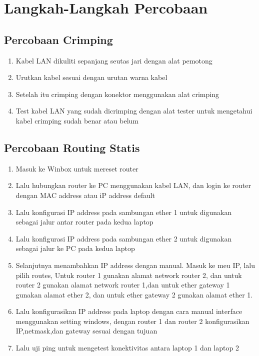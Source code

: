 \section{Langkah-Langkah Percobaan}

\subsection{Percobaan Crimping}
\begin{enumerate}
	\item Kabel LAN dikuliti sepanjang seutas jari dengan alat pemotong
	\item Urutkan kabel sesuai dengan urutan warna kabel
	\item Setelah itu crimping dengan konektor menggunakan alat crimping
	\item Test kabel LAN yang sudah dicrimping dengan  alat tester untuk mengetahui kabel crimping sudah benar atau belum
\end{enumerate}

\subsection{Percobaan Routing Statis}
\begin{enumerate}
    \item Masuk ke Winbox untuk mereset router
    \item Lalu hubungkan router ke PC menggunakan kabel LAN, dan login ke router dengan MAC address
    atau iP address default
    \item Lalu konfigurasi IP address pada sambungan ether 1 untuk digunakan sebagai jalur antar router pada kedua laptop
    \item Lalu konfigurasi IP address pada sambungan ether 2 untuk digunakan sebagai jalur ke PC pada kedua laptop
    \item Selanjutnya menambahkan IP address dengan manual. Masuk ke meu IP, lalu pilih routes, Untuk router 1 
    gunakan alamat network router 2, dan untuk router 2 gunakan alamat network router 1,dan untuk 
    ether gateway 1 gunakan alamat ether 2, dan untuk ether gateway 2 gunakan alamat ether 1.
    \item Lalu konfigurasikan IP address pada laptop dengan cara manual interface menggunakan setting
    windows, dengan router 1 dan router 2 konfigurasikan IP,netmask,dan gateway sesuai dengan tujuan
    \item Lalu uji ping untuk mengetest konektivitas antara laptop 1 dan laptop 2  
\end{enumerate}


